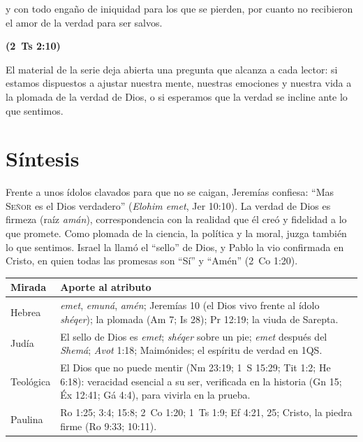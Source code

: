 \documentclass[11pt,letterpaper]{article}
\newcommand{\SENOR}{\textsc{Señor}}
\newcommand{\fuente}[1]{\par\hfill{\upshape\bfseries\small\textcolor{azul}{#1}}}
\begin{document}
\begin{cita}y con todo engaño de iniquidad para los que se pierden, por cuanto no recibieron el amor de la verdad para ser salvos.\fuente{(2~Ts 2:10)}\end{cita}

El material de la serie deja abierta una pregunta que alcanza a cada lector: si estamos dispuestos a ajustar nuestra mente, nuestras emociones y nuestra vida a la plomada de la verdad de Dios, o si esperamos que la verdad se incline ante lo que sentimos.

\section{Síntesis}

\begin{tcolorbox}[colback=papiro,colframe=azul,boxrule=1pt,arc=3pt]
Frente a unos ídolos clavados para que no se caigan, Jeremías confiesa: ``Mas \SENOR{} es el Dios verdadero'' (\emph{Elohim emet}, Jer 10:10). La verdad de Dios es firmeza (raíz \emph{amán}), correspondencia con la realidad que él creó y fidelidad a lo que promete. Como plomada de la ciencia, la política y la moral, juzga también lo que sentimos. Israel la llamó el ``sello'' de Dios, y Pablo la vio confirmada en Cristo, en quien todas las promesas son ``Sí'' y ``Amén'' (2~Co 1:20).
\end{tcolorbox}

\begin{center}\small\renewcommand{\arraystretch}{1.3}
\begin{tabular}{@{}L{3.0cm}L{11.4cm}@{}}
\toprule
\textbf{Mirada} & \textbf{Aporte al atributo} \\ \midrule
Hebrea & \emph{emet}, \emph{emuná}, \emph{amén}; Jeremías 10 (el Dios vivo frente al ídolo \emph{shéqer}); la plomada (Am 7; Is 28); Pr 12:19; la viuda de Sarepta. \\
Judía & El sello de Dios es \emph{emet}; \emph{shéqer} sobre un pie; \emph{emet} después del \emph{Shemá}; \emph{Avot} 1:18; Maimónides; el espíritu de verdad en 1QS. \\
Teológica & El Dios que no puede mentir (Nm 23:19; 1~S 15:29; Tit 1:2; He 6:18): veracidad esencial a su ser, verificada en la historia (Gn 15; Éx 12:41; Gá 4:4), para vivirla en la prueba. \\
Paulina & Ro 1:25; 3:4; 15:8; 2~Co 1:20; 1~Ts 1:9; Ef 4:21, 25; Cristo, la piedra firme (Ro 9:33; 10:11). \\
\bottomrule
\end{tabular}\end{center}
\end{document}
